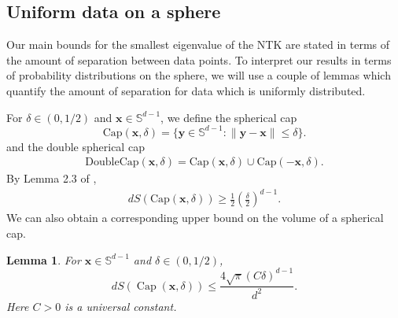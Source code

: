 \documentclass{article}
\newtheorem{lemma}[theorem]{Lemma}
\theoremstyle{definition}
\DeclareMathOperator{\sphericalcap}{Cap}
\renewcommand{\S}{\mathbb{S}}
\def\vx{{\bm{x}}}
\def\vy{{\bm{y}}}
\begin{document}
\subsection{Uniform data on a sphere}\label{app:subsec:uniform-sphere}
Our main bounds for the smallest eigenvalue of the NTK are stated in terms of the amount of separation between data points. To interpret our results in terms of probability distributions on the sphere, we will use a couple of lemmas which quantify the amount of separation for data which is uniformly distributed.

For $\delta \in (0, 1/2)$ and $\vx \in \S^{d -1 }$, we define the spherical cap
    \[\text{Cap}(\vx, \delta) = \{\vy \in \S^{d - 1}: \|\vy - \vx\| \leq \delta\}. \]
    and the double spherical cap
    \begin{align*}
        \text{DoubleCap}(\vx, \delta) = \text{Cap}(\vx, \delta) \cup \text{Cap}(-\vx, \delta).
    \end{align*}
    By Lemma 2.3 of \cite{ball1997elementary},
    \begin{align}
     dS(\text{Cap}(\vx, \delta)) \geq \frac{1}{2}\left(\frac{\delta}{2}\right)^{d - 1}.\label{eqn:spherical-cap-lower-bound}
    \end{align}    
    We can also obtain a corresponding upper bound on the volume of a spherical cap.
    \begin{lemma}\label{lemma:spherical-cap-upper-bound}
        For $\vx \in \S^{d - 1}$ and $\delta \in (0, 1/2)$,
        \[dS(\sphericalcap(\vx, \delta)) \leq \frac{4\sqrt{\pi}(C\delta)^{d - 1} }{d^2}. \]
        Here $C > 0$ is a universal constant.
    \end{lemma}
\end{document}
